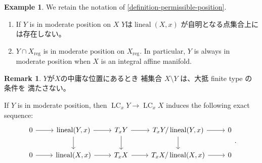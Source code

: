 \documentclass[a4paper,dvipdfmx,reqno,12pt]{amsart}
\theoremstyle{definition}
\newtheorem{example}[theorem]{Example}
\newtheorem{remark}[theorem]{Remark}
\newcommand{\opn}[1]{\operatorname{#1}}
\numberwithin{equation}{section}
\begin{document}
\begin{example}
We retain the notation of 
\cref{definition-permissible-position}.
\begin{enumerate}
\item If $Y$ is in moderate position on $X$
$Y$は$\opn{lineal}(X,x)$
が自明となる点集合上には存在しない。
\item $Y\cap X_{\mathrm{reg}}$ is in 
moderate position on $X_{\mathrm{reg}}$.
In particular, $Y$ is always in moderate position
when $X$ is an integral affine manifold.
\end{enumerate}

\begin{remark}
$Y$が$X$の中庸な位置にあるとき
補集合 $X\setminus Y$ は、大抵 finite type の条件を
満たさない。
\end{remark}

\end{example}
If $Y$ is in moderate position, then 
$\opn{LC}_x Y\to \opn{LC}_x X$ induces the following 
exact sequence:
\[\begin{tikzcd}
	0 & {\opn{lineal}(Y,x)} & {T_x Y} & {T_x Y/\opn{lineal}(Y,x)} & 0 \\
	0 & {\opn{lineal}(X,x)} & {T_x X} & 
{T_x X/\opn{lineal}(X,x)} & 0
	\arrow[from=1-1, to=1-2]
	\arrow[from=2-1, to=2-2]
	\arrow[from=2-3, to=2-4]
	\arrow[from=1-3, to=1-4]
	\arrow[from=1-4, to=2-4]
	\arrow[from=1-2, to=2-2]
	\arrow[from=1-2, to=1-3]
	\arrow[from=2-2, to=2-3]
	\arrow[from=1-3, to=2-3]
	\arrow[from=2-4, to=2-5]
	\arrow[from=1-4, to=1-5]
\end{tikzcd}.\]
\end{document}
